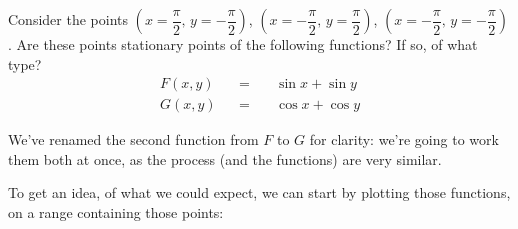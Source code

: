 \documentclass[solutions.tex]{subfiles}
\begin{document}
\maketitle
\begin{exercise} Consider the points $(x=\dfrac\pi2,\,y=-\dfrac\pi2)$,
$(x=-\dfrac\pi2,\,y=\dfrac\pi2)$, $(x=-\dfrac\pi2,\,y=-\dfrac\pi2)$.
Are these points stationary points of the following functions? If so,
of what type?
\begin{equation*} \begin{aligned}
	F(x,y) &&=\quad& \sin x + \sin y \\
	G(x,y) &&=\quad& \cos x + \cos y
\end{aligned} \end{equation*}
\end{exercise}
\begin{remark} We've renamed the second function from $F$ to $G$
for clarity: we're going to work them both at once, as the process
(and the functions) are very similar.
\end{remark}

To get an idea, of what we could expect, we can start by plotting
those functions, on a range containing those points:
\begin{figure}[H]
	\centering
	\begin{minipage}{0.45\textwidth}
		\centering
	\end{minipage}
	\begin{minipage}{0.45\textwidth}
		\centering
	\end{minipage}
\end{figure}
\end{document}
